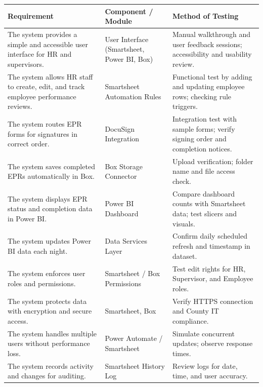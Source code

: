 \documentclass[12pt]{article}
\def\textbf#1{#1}%
\begin{document}
\begin{tabular}{|p{5cm}|p{4cm}|p{7cm}|}
\hline
\textbf{Requirement} & \textbf{Component / Module} & \textbf{Method of Testing} \\ \hline

The system provides a simple and accessible user interface for HR and supervisors. &
User Interface (Smartsheet, Power BI, Box) &
Manual walkthrough and user feedback sessions; accessibility and usability review. \\ \hline

The system allows HR staff to create, edit, and track employee performance reviews. &
Smartsheet Automation Rules &
Functional test by adding and updating employee rows; checking rule triggers. \\ \hline

The system routes EPR forms for signatures in correct order. &
DocuSign Integration &
Integration test with sample forms; verify signing order and completion notices. \\ \hline

The system saves completed EPRs automatically in Box. &
Box Storage Connector &
Upload verification; folder name and file access check. \\ \hline

The system displays EPR status and completion data in Power BI. &
Power BI Dashboard &
Compare dashboard counts with Smartsheet data; test slicers and visuals. \\ \hline

The system updates Power BI data each night. &
Data Services Layer &
Confirm daily scheduled refresh and timestamp in dataset. \\ \hline

The system enforces user roles and permissions. &
Smartsheet / Box Permissions &
Test edit rights for HR, Supervisor, and Employee roles. \\ \hline

The system protects data with encryption and secure access. &
Smartsheet, Box &
Verify HTTPS connection and County IT compliance. \\ \hline

The system handles multiple users without performance loss. &
Power Automate / Smartsheet &
Simulate concurrent updates; observe response times. \\ \hline

The system records activity and changes for auditing. &
Smartsheet History Log &
Review logs for date, time, and user accuracy. \\ \hline

\end{tabular}
\end{document}
